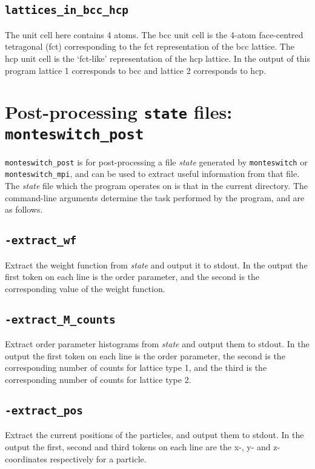 \documentclass{report}
\begin{document}
\subsection{\texttt{lattices\_in\_bcc\_hcp}}
The unit cell here contains 4 atoms. The bcc unit cell is the 4-atom face-centred tetragonal (fct) corresponding to the fct representation of 
the bcc lattice. The hcp unit cell is the `fct-like' representation of the hcp lattice. In the output of this program
lattice 1 corresponds to bcc and lattice 2 corresponds to hcp.


\section{Post-processing \texttt{state} files: \texttt{monteswitch\_post}}\label{sec:monteswitch_post}
\texttt{monteswitch\_post} is for post-processing a file \emph{state} generated by \texttt{monteswitch} or \texttt{monteswitch\_mpi}, and can
be used to extract useful information from that file. The \emph{state} file which the program operates on is that in the current directory.
The command-line arguments determine the task performed by the program, and are as follows.

\subsection{\texttt{-extract\_wf}}
Extract the weight function from \emph{state} and output it to stdout. In the output the first token on each line is the order parameter, 
and the second is the corresponding value of the weight function.

\subsection{\texttt{-extract\_M\_counts}}
Extract order parameter histograms from \emph{state} and output them to stdout. In the output the first token on each line is the order 
parameter, the second is the corresponding number of counts for lattice type 1, and the third is the corresponding number of counts for 
lattice type 2. 

\subsection{\texttt{-extract\_pos}}
Extract the current positions of the particles, and output them to stdout. In the output the first, second and third tokens on each line 
are the x-, y- and z-coordinates respectively for a particle. 
\end{document}
